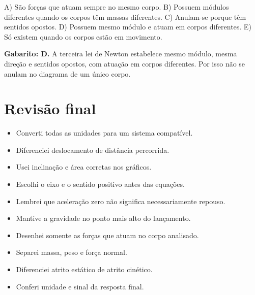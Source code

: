 \documentclass[11pt,a4paper]{article}
\begin{document}
A) São forças que atuam sempre no mesmo corpo. B) Possuem módulos diferentes quando os corpos têm massas diferentes. C) Anulam-se porque têm sentidos opostos. D) Possuem mesmo módulo e atuam em corpos diferentes. E) Só existem quando os corpos estão em movimento.

\begin{alerta}
\textbf{Gabarito: D.} A terceira lei de Newton estabelece mesmo módulo, mesma direção e sentidos opostos, com atuação em corpos diferentes. Por isso não se anulam no diagrama de um único corpo.
\end{alerta}

\section*{Revisão final}

\begin{itemize}
  \item[$\square$] Converti todas as unidades para um sistema compatível.
  \item[$\square$] Diferenciei deslocamento de distância percorrida.
  \item[$\square$] Usei inclinação e área corretas nos gráficos.
  \item[$\square$] Escolhi o eixo e o sentido positivo antes das equações.
  \item[$\square$] Lembrei que aceleração zero não significa necessariamente repouso.
  \item[$\square$] Mantive a gravidade no ponto mais alto do lançamento.
  \item[$\square$] Desenhei somente as forças que atuam no corpo analisado.
  \item[$\square$] Separei massa, peso e força normal.
  \item[$\square$] Diferenciei atrito estático de atrito cinético.
  \item[$\square$] Conferi unidade e sinal da resposta final.
\end{itemize}
\end{document}
